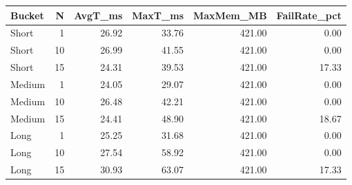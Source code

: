 \begin{tabular}{lrrrrr}
\toprule
Bucket & N & AvgT\_ms & MaxT\_ms & MaxMem\_MB & FailRate\_pct \\
\midrule
Short & 1 & 26.92 & 33.76 & 421.00 & 0.00 \\
Short & 10 & 26.99 & 41.55 & 421.00 & 0.00 \\
Short & 15 & 24.31 & 39.53 & 421.00 & 17.33 \\
Medium & 1 & 24.05 & 29.07 & 421.00 & 0.00 \\
Medium & 10 & 26.48 & 42.21 & 421.00 & 0.00 \\
Medium & 15 & 24.41 & 48.90 & 421.00 & 18.67 \\
Long & 1 & 25.25 & 31.68 & 421.00 & 0.00 \\
Long & 10 & 27.54 & 58.92 & 421.00 & 0.00 \\
Long & 15 & 30.93 & 63.07 & 421.00 & 17.33 \\
\bottomrule
\end{tabular}
